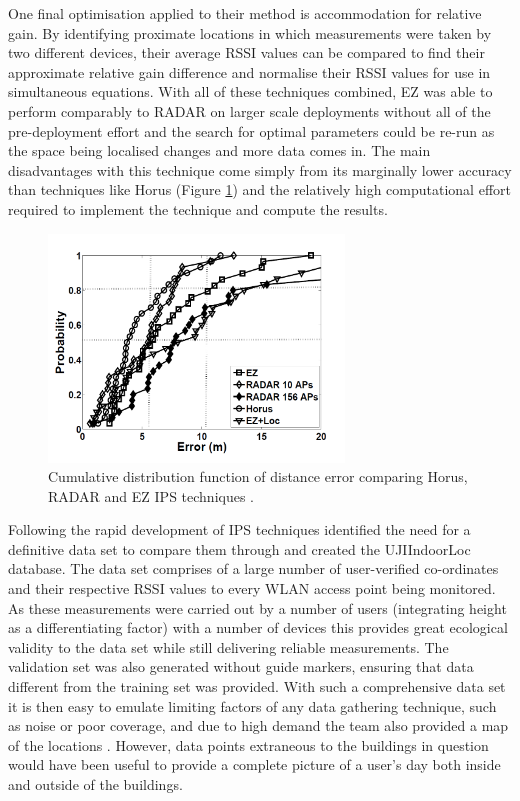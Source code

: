 \documentclass{UoYCSproject}
\begin{document}
                One final optimisation applied to their method is accommodation for relative gain. By identifying proximate locations in which measurements were taken by two different devices, their average RSSI values can be compared to find their approximate relative gain difference and normalise their RSSI values for use in simultaneous equations. With all of these techniques combined, EZ was able to perform comparably to RADAR on larger scale deployments without all of the pre-deployment effort and the search for optimal parameters could be re-run as the space being localised changes and more data comes in. The main disadvantages with this technique come simply from its marginally lower accuracy than techniques like Horus (Figure \ref{fig:EZHorusRADARComparison}) and the relatively high computational effort required to implement the technique and compute the results.
                
                \begin{figure}[h]
                    \label{fig:EZHorusRADARComparison}
                    \centering
                    \includegraphics[width=0.7\textwidth]{EZHorusRADARComparison.png}
                    \caption{Cumulative distribution function of distance error comparing Horus, RADAR and EZ IPS techniques \citep{chintalapudi2010indoor}.}
                \end{figure}
                
                Following the rapid development of IPS techniques \citet{torres2014ujiindoorloc} identified the need for a definitive data set to compare them through and created the UJIIndoorLoc database. The data set comprises of a large number of user-verified co-ordinates and their respective RSSI values to every WLAN access point being monitored. As these measurements were carried out by a number of users (integrating height as a differentiating factor) with a number of devices this provides great ecological validity to the data set while still delivering reliable measurements. The validation set was also generated without guide markers, ensuring that data different from the training set was provided. With such a comprehensive data set it is then easy to emulate limiting factors of any data gathering technique, such as noise or poor coverage, and due to high demand the team also provided a map of the locations \citep{UJIIndoorLocMap}. However, data points extraneous to the buildings in question would have been useful to provide a complete picture of a user's day both inside and outside of the buildings.
            
\end{document}
